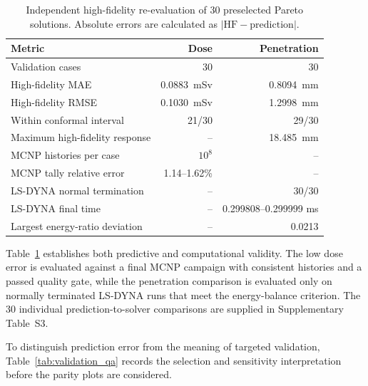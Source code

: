 \documentclass[12pt]{elsarticle}
\newcommand{\SI}[2]{#1~#2}
\newif\ifproductionnotes
\newcommand{\productionnote}[1]{%
\ifproductionnotes
\par\medskip\noindent\fcolorbox{black}{gray!12}{\begin{minipage}{0.94\linewidth}\footnotesize\textbf{Production note for the figure/table designer.} #1\end{minipage}}\par\medskip
\fi}
\begin{document}
	\begin{table}[htbp]
		\centering
		\caption{Independent high-fidelity re-evaluation of 30 preselected Pareto solutions. Absolute errors are calculated as $|\mathrm{HF}-\mathrm{prediction}|$.}
		\label{tab:validation}
		\begin{tabular}{@{}lrr@{}}
			\toprule
			Metric & Dose & Penetration \\
			\midrule
			Validation cases & 30 & 30 \\
			High-fidelity MAE & \SI{0.0883}{mSv} & \SI{0.8094}{mm} \\
			High-fidelity RMSE & \SI{0.1030}{mSv} & \SI{1.2998}{mm} \\
			Within conformal interval & 21/30 & 29/30 \\
			Maximum high-fidelity response & -- & \SI{18.485}{mm} \\
			MCNP histories per case & $10^8$ & -- \\
			MCNP tally relative error & 1.14--1.62\% & -- \\
			LS-DYNA normal termination & -- & 30/30 \\
			LS-DYNA final time & -- & 0.299808--0.299999 ms \\
			Largest energy-ratio deviation & -- & 0.0213 \\
			\bottomrule
		\end{tabular}
	\end{table}
	\productionnote{\textbf{Tabela~\ref{tab:validation} --- briefing para Carlos.} Usar \texttt{Fase 5/VALIDACAO\_ALTA\_FIDELIDADE/fase4\_20261003\_043316\_MCNP63\_DEDF\_AP\_30/study\_30/validacao\_alta\_fidelidade\_consolidada.csv}, \texttt{mcnp\_run\_manifest.csv} e \texttt{lsdyna/study\_validation\_summary.csv}. Produzir uma tabela-resumo no corpo principal e disponibilizar os 30 registros individuais como material suplementar. Distinguir visualmente erro de predi\c{c}\~ao, evid\^encia de QA dos solvers e cobertura conformal.}

	Table~\ref{tab:validation} establishes both predictive and computational validity. The low dose error is evaluated against a final MCNP campaign with consistent histories and a passed quality gate, while the penetration comparison is evaluated only on normally terminated LS-DYNA runs that meet the energy-balance criterion. The 30 individual prediction-to-solver comparisons are supplied in Supplementary Table~S3.

	To distinguish prediction error from the meaning of targeted validation, Table~\ref{tab:validation_qa} records the selection and sensitivity interpretation before the parity plots are considered.
\end{document}
